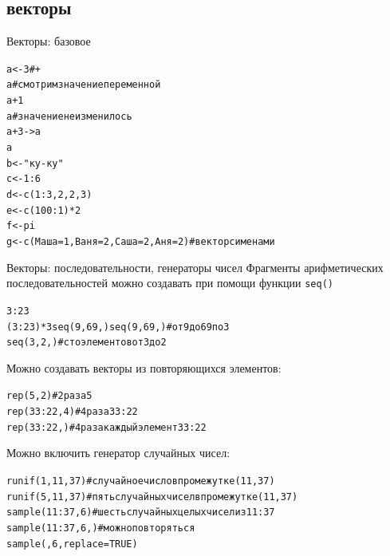 \subsection{векторы}
\begin{frame}[fragile]{Векторы: базовое}
\footnotesize 
\begin{alltt}
a <- 3 \hfill # + \beamerbutton{-}\medskip
a \hfill # смотрим значение переменной\medskip
a + 1\medskip
a \hfill  # значение не изменилось\medskip
a + 3 -> a\medskip
a\medskip
b <- "ку-ку"\medskip
c <- 1:6\medskip
d <- c(1:3, 2, 2, 3)\medskip
e <- c(100:1)*2\medskip
f <- pi\medskip
g <- c(Маша = 1, Ваня = 2, Саша = 2, Аня = 2) \hfill # вектор с именами
\end{alltt}
\end{frame}
\begin{frame}[fragile]{Векторы: последовательности, генераторы чисел}
Фрагменты арифметических последовательностей можно создавать при помощи функции \footnotesize\verb"seq()"\normalsize \\
\footnotesize 
\begin{alltt}
3:23 \hfill {\color{red!13!blue}{seq(3, 23)}}
(3:23)*3\hfill seq(9, 69, {\color{red!13!blue}{by = 3}})\hfill seq(9, 69, {\color{red!13!blue}{3}})\hfill \# от 9 до 69 по 3
seq(3, 2, {\color{red!13!blue}{length=100}}) \hfill \# сто элементов от 3 до 2
\end{alltt}
\normalsize
\vfill
Можно создавать векторы из повторяющихся элементов:
\footnotesize 
\begin{alltt}
rep(5, 2) \hfill \# 2 раза 5
rep(33:22, 4) \hfill \# 4 раза 33:22
rep(33:22, {\color{red!13!blue}{each = 4}}) \hfill \# 4 раза каждый элемент 33:22
\end{alltt}
\normalsize
\vfill
Можно включить генератор случайных чисел:
\footnotesize 
\begin{alltt}
runif(1, 11, 37) \hfill \# случайное число в промежутке (11, 37)
runif(5, 11, 37) \hfill \# пять случайных чисел в промежутке (11, 37)
sample(11:37, 6) \hfill \# шесть случайных целых чисел из 11:37
sample(11:37, 6, {\color{red!13!blue}{replace=TRUE}}) \hfill \# можно повторяться
sample({\color{red!13!blue}{c("a", "u", "o", "y")}}, 6, replace=TRUE) 
\end{alltt}
\normalsize
\end{frame}
